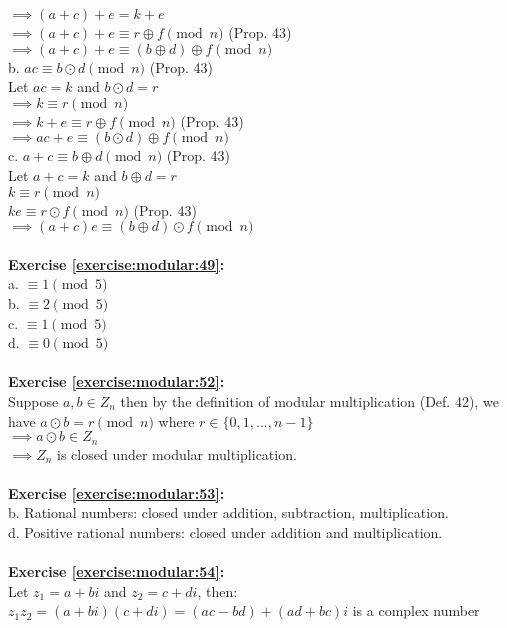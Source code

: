 $\implies (a+c)+e=k+e$\\
$\implies (a+c)+e \equiv r \oplus f \pmod{n}$ (Prop. 43)\\
$\implies (a+c)+e \equiv (b \oplus d) \oplus f \pmod{n}$\\
b. $ac \equiv b \odot d \pmod{n}$ (Prop. 43)\\
Let $ac=k$ and $b \odot d =r$\\
$\implies k \equiv r \pmod{n}$\\
$\implies k+e \equiv r \oplus f \pmod{n}$ (Prop. 43)\\
$\implies ac+e \equiv (b \odot d) \oplus f \pmod{n}$\\
c. $a+c \equiv b \oplus d \pmod{n}$ (Prop. 43)\\
Let $a+c=k$ and $b \oplus d =r$\\
$k \equiv r \pmod{n}$\\
$ke \equiv r \odot f \pmod{n}$ (Prop. 43)\\
$\implies (a+c)e \equiv (b \oplus d) \odot f \pmod{n}$\\
\\
\textbf{Exercise \ref{exercise:modular:49}:}\\
a. $\equiv 1 \pmod{5}$\\
b. $\equiv 2 \pmod{5}$\\
c. $\equiv 1 \pmod{5}$\\
d. $\equiv 0 \pmod{5}$\\
\\
\textbf{Exercise \ref{exercise:modular:52}:}\\
Suppose $a,b \in Z_n$ then by the definition of modular multiplication (Def. 42), we have $a \odot b =r \pmod{n}$ where $r \in \{0,1,...,n-1\}$\\
$\implies a \odot b \in Z_n$\\
$\implies Z_n$ is closed under modular multiplication.\\
\\
\textbf{Exercise \ref{exercise:modular:53}:}\\
b. Rational numbers: closed under addition, subtraction, multiplication.\\
d. Positive rational numbers: closed under addition and multiplication.\\
\\
\textbf{Exercise \ref{exercise:modular:54}:}\\
Let $z_1=a+bi$ and $z_2=c+di$, then:\\
$z_1z_2=(a+bi)(c+di)=(ac-bd)+(ad+bc)i$ is a complex number\\
